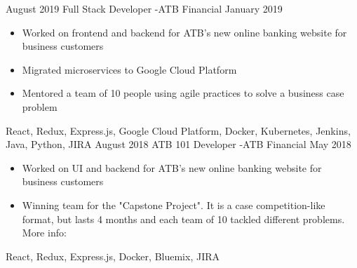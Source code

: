 
\begin{experiences}
  \experience
    {August 2019}   {Full Stack Developer -}{ATB Financial}{}
    {January 2019} {
                      \begin{itemize}
                        \item Worked on frontend and backend for ATB's new online banking website for business customers
                        \item Migrated microservices to Google Cloud Platform
                        \item Mentored a team of 10 people using agile practices to solve a business case problem
                      \end{itemize}
                    }
                    {
                        React,
                        Redux,
                        Express.js,
                        Google Cloud Platform,
                        Docker,
                        Kubernetes,
                        Jenkins,
                        Java,
                        Python,
                        JIRA
                    }
  \emptySeparator
  \experience
  {August 2018}   {ATB 101 Developer -}{ATB Financial}{}
  {May 2018} {
                    \begin{itemize}
                      \item Worked on UI and backend for ATB's new online banking website for business customers
                      \item Winning team for the "Capstone Project". It is a case competition-like format,
                      but lasts 4 months and each team of 10 tackled different problems.
                      More info: 
                    \end{itemize}
                  }
                  {
                      React,
                      Redux,
                      Express.js,
                      Docker,
                      Bluemix,
                      JIRA
                  }
\end{experiences}
